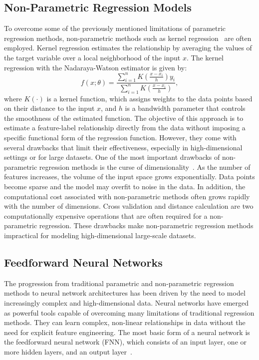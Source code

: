 \subsection{Non-Parametric Regression Models}
To overcome some of the previously mentioned limitations of parametric regression methods, non-parametric methods such as kernel regression~\citep{hastie2009elements} are often employed. 
Kernel regression estimates the relationship by averaging the values of the target variable over a local neighborhood of the input $x$.
The kernel regression with the Nadaraya-Watson estimator is given by:
\begin{equation}
    f(x; \theta) = \frac{\sum_{i=1}^{n} K\left(\frac{x-x_i}{h}\right) y_i}{\sum_{i=1}^{n} K\left(\frac{x-x_i}{h}\right)},
\end{equation}
where $K(\cdot)$ is a kernel function, which assigns weights to the data points based on their distance to the input $x$, and $h$ is a bandwidth parameter that controls the smoothness of the estimated function.
The objective of this approach is to estimate a feature-label relationship directly from the data without imposing a specific functional form of the regression function.
However, they come with several drawbacks that limit their effectiveness, especially in high-dimensional settings or for large datasets. 
One of the most important drawbacks of non-parametric regression methods is the curse of dimensionality~\cite{bellman1966dynamic}. 
As the number of features increases, the volume of the input space grows exponentially.
Data points become sparse and the model may overfit to noise in the data.
In addition, the computational cost associated with non-parametric methods often grows rapidly with the number of dimensions.
Cross validation and distance calculation are two computationally expensive operations that are often required for a non-parametric regression.
These drawbacks make non-parametric regression methods impractical for modeling high-dimensional large-scale datasets. 

\subsection{Feedforward Neural Networks}

The progression from traditional parametric and non-parametric regression methods to neural network architectures has been driven by the need to model increasingly complex and high-dimensional data.
Neural networks have emerged as powerful tools capable of overcoming many limitations of traditional regression methods. 
They can learn complex, non-linear relationships in data without the need for explicit feature engineering.
The most basic form of a neural network is the feedforward neural network (FNN), which consists of an input layer, one or more hidden layers, and an output layer~\citep{goodfellow2016}.

